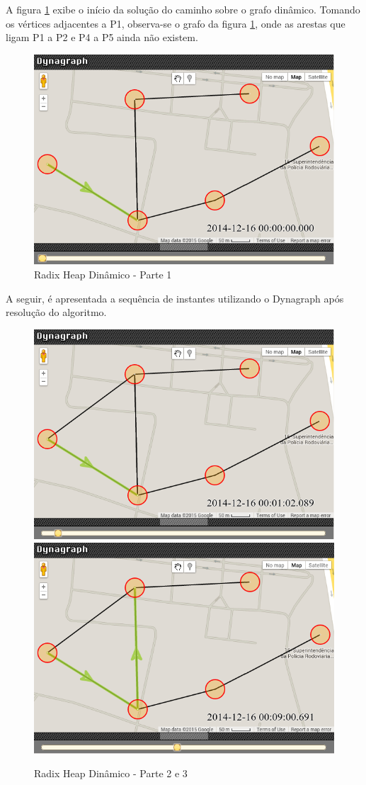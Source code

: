 A figura \ref{fig:dyndyn1} exibe o início da solução do caminho sobre o grafo dinâmico.
Tomando os vértices adjacentes a P1, observa-se o grafo da figura \ref{fig:dyndyn1}, onde as arestas
que ligam P1 a P2 e P4 a P5 ainda não existem.

\begin{figure}[htbp]
\centering
 \includegraphics[width=.55\textwidth]{chapters/fig/dyndyn1.png}
\caption{Radix Heap Dinâmico - Parte 1}
\label{fig:dyndyn1}
\end{figure}
\FloatBarrier

A seguir, é apresentada a sequência de instantes utilizando o Dynagraph após resolução do algoritmo.

\begin{figure}[htbp]
\centering
 \includegraphics[width=.42\textwidth]{chapters/fig/dyndyn2.png}
 \includegraphics[width=.42\textwidth]{chapters/fig/dyndyn3.png}
\caption{Radix Heap Dinâmico - Parte 2 e 3}
\label{fig:dyndyn2}
\end{figure}

